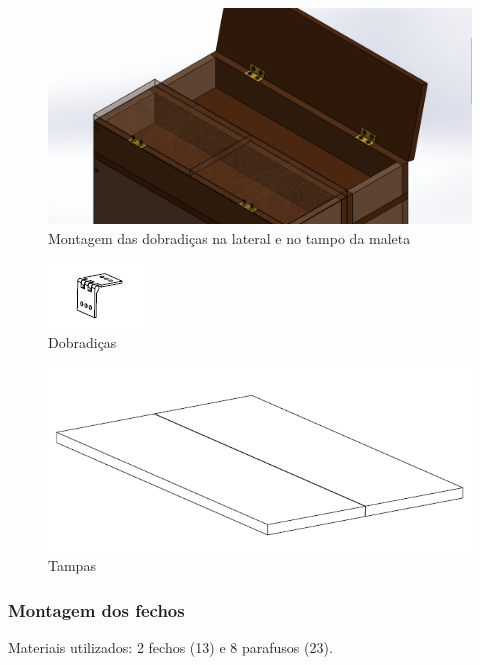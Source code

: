 \begin{figure} [H]
    \centering
    \includegraphics[width=.7\textwidth]{Figuras/montagemMaletasEstrutura/alimentacaoDobradicas.png}
    \caption{Montagem das dobradiças na lateral e no tampo da maleta}
    \label{fig:alimentacaoDobradicas}
\end{figure}

\begin{figure} [H]
    \centering
    \includegraphics[width=.5\textwidth]{Figuras/suporte/dobradicas.png}
    \caption{Dobradiças}
\end{figure}

\begin{figure} [H]
    \centering
    \includegraphics[width=.7\textwidth]{Figuras/suporte/tampas.png}
    \caption{Tampas}
\end{figure}

\subsubsection{Montagem dos fechos}

Materiais utilizados: 2 fechos (13) e 8 parafusos (23).

